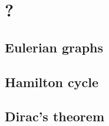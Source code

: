 \documentclass[main]{subfiles}
\begin{document}

\section{?}
\subsection{Eulerian graphs}

\subsection{Hamilton cycle}

\subsection{Dirac's theorem}

\end{document}
